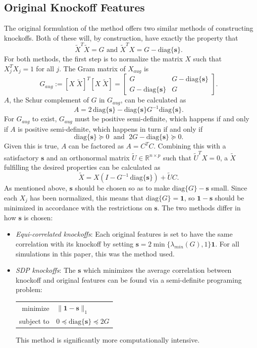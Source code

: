 \documentclass[11pt]{article}
\newcommand{\R}{\mathbb{R}}
\newcommand{\diag}[1]{\mathrm{diag}\{#1\}}
\theoremstyle{definition}
\begin{document}
\subsection{Original Knockoff Features}
    The original formulation of the method offers two similar methods of constructing knockoffs. Both of these will, by construction, have exactly the property that
    \[ \tilde X^T\tilde X=G \textrm{ and } \tilde X^T X = G - \diag{\mathbf s}.\]
    For both methods, the first step is to normalize the matrix $X$ such that $X_j^TX_j=1$ for all $j$. The Gram matrix of $X_{aug}$ is
    \[ G_{aug}:= [X\; \tilde X]^T[X\; \tilde X] = \left[ \begin{array}{cc} G & G - \diag{\mathbf s} \\ G - \diag{\mathbf s} & G \end{array}\right]. \]
    $A$, the Schur complement of $G$ in $G_{aug}$, can be calculated as 
    \[ A = 2\,\diag{\mathbf s} - \diag{\mathbf s}G^{-1}\diag{\mathbf s}. \]
    For $G_{aug}$ to exist, $G_{aug}$ must be positive semi-definite, which happens if and only if $A$ is positive semi-definite, which happens in turn if and only if 
    \[ \diag{\mathbf s} \succeq 0  \; \textrm{ and } \; 2G - \diag{\mathbf s} \succeq 0. \]
    Given this is true, $A$ can be factored as $A=C^TC$. Combining this with a satisfactory $\mathbf s$ and an orthonormal matrix $\tilde U\in\R^{n\times p}$ such that $\tilde U^T X = 0$, a $\tilde X$ fulfilling the desired properties can be calculated as 
    \[ \tilde X = X(I-G^{-1}\,\diag{\mathbf s}) + \tilde UC.\]
    As mentioned above, $\mathbf s$ should be chosen so as to make $\diag{G}-\mathbf s$ small. Since each $X_j$ has been normalized, this means that $\diag{G}=\mathbf 1$, so $\mathbf 1 - \mathbf s$ should be minimized in accordance with the restrictions on $\mathbf s$. The two methods differ in how $\mathbf s$ is chosen:
    \begin{itemize}
        \item \textit{Equi-correlated knockoffs}: Each original features is set to have the same correlation with its knockoff by setting $\mathbf s = 2\min\{\lambda_{min}(G),1\}\mathbf 1$. For all simulations in this paper, this was the method used.
        \item \textit{SDP knockoffs}: The $\mathbf s$ which minimizes the average correlation between knockoff and original features can be found via a semi-definite programing problem:
            \begin{center}
                \begin{tabular}{r l}
                    minimize & $\|\mathbf1-\mathbf s\|_1$ \\
                    subject to & $ 0 \preceq \diag{\mathbf s} \preceq 2G $
                \end{tabular} 
            \end{center}
            This method is significantly more computationally intensive. 
    \end{itemize}
     
\end{document}
